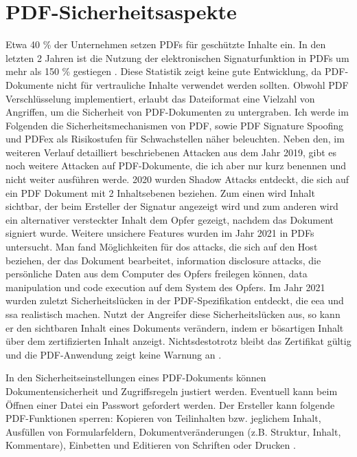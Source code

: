 \section{PDF-Sicherheitsaspekte}
Etwa 40 \% der Unternehmen setzen PDFs für geschützte Inhalte ein. In den letzten 2 Jahren ist die Nutzung der elektronischen Signaturfunktion in PDFs um mehr als 150 \% gestiegen \cite{formilo}. Diese Statistik zeigt keine gute Entwicklung, da PDF-Dokumente nicht für vertrauliche Inhalte verwendet werden sollten. Obwohl PDF Verschlüsselung implementiert, erlaubt das Dateiformat eine Vielzahl von Angriffen, um die Sicherheit von PDF-Dokumenten zu untergraben. Ich werde im Folgenden die Sicherheitsmechanismen von PDF, sowie PDF Signature Spoofing und PDFex als Risikostufen für Schwachstellen näher beleuchten. Neben den, im weiteren Verlauf detailliert beschriebenen Attacken aus dem Jahr 2019, gibt es noch weitere Attacken auf PDF-Dokumente, die ich aber nur kurz benennen und nicht weiter ausführen werde. 2020 wurden Shadow Attacks entdeckt, die sich auf ein PDF Dokument mit 2 Inhaltsebenen beziehen. Zum einen wird Inhalt sichtbar, der beim Ersteller der Signatur angezeigt wird und zum anderen wird ein alternativer versteckter Inhalt dem Opfer gezeigt, nachdem das Dokument signiert wurde. Weitere unsichere Features wurden im Jahr 2021 in PDFs untersucht. Man fand Möglichkeiten für \gls{dos} attacks, die sich auf den Host beziehen, der das Dokument bearbeitet, information disclosure attacks, die persönliche Daten aus dem Computer des Opfers freilegen können, data manipulation und code execution auf dem System des Opfers. Im Jahr 2021 wurden zuletzt Sicherheitslücken in der PDF-Spezifikation entdeckt, die \gls{eea} und \gls{ssa} realistisch machen. Nutzt der Angreifer diese Sicherheitslücken aus, so kann er den sichtbaren Inhalt eines Dokuments verändern, indem er bösartigen Inhalt über dem zertifizierten Inhalt anzeigt. Nichtsdestotrotz bleibt das Zertifikat gültig und die PDF-Anwendung zeigt keine Warnung an \cite{pdf-insec}.
\par
In den Sicherheitseinstellungen eines PDF-Dokuments können Dokumentensicherheit und Zugriffsregeln justiert werden. Eventuell kann beim Öffnen einer Datei ein Passwort gefordert werden. Der Ersteller kann folgende PDF-Funktionen sperren: Kopieren von Teilinhalten bzw. jeglichem Inhalt, Ausfüllen von Formularfeldern, Dokumentveränderungen (z.B. Struktur, Inhalt, Kommentare), Einbetten und Editieren von Schriften oder Drucken \cite{adobe-pdf-pades}. 

